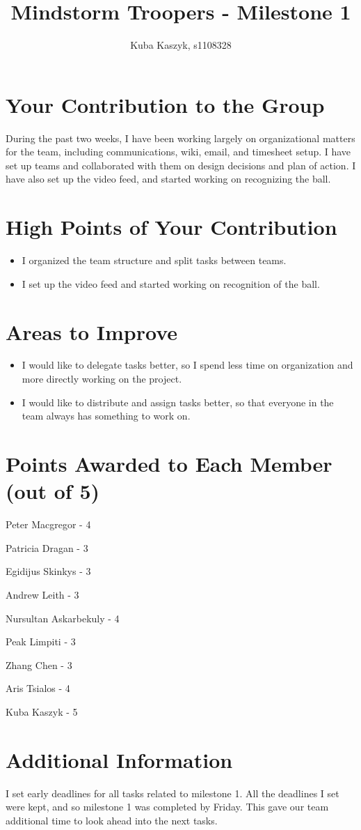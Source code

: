 \documentclass[dvips]{article}
\begin{document}
\sloppy
\title{Mindstorm Troopers - Milestone 1}
 
\author{Kuba Kaszyk, s1108328}
 
\maketitle

\section{Your Contribution to the Group}
During the past two weeks, I have been working largely on organizational matters for the team, including communications, wiki, email, and timesheet setup. I have set up teams and collaborated with them on design decisions and plan of action. I have also set up the video feed, and started working on recognizing the ball.  

\section{High Points of Your Contribution}
\begin{itemize}
  \item I organized the team structure and split tasks between teams.
  \item I set up the video feed and started working on recognition of the ball.
\end{itemize} 

\section{Areas to Improve}
\begin{itemize}
  \item I would like to delegate tasks better, so I spend less time on organization and more directly working on the project.
  \item I would like to distribute and assign tasks better, so that everyone in the team always has something to work on. 
\end{itemize}


\section{Points Awarded to Each Member (out of 5)}
\begin{itemize}
\begin{multicols}{2}
\item Peter Macgregor - 4
\item Patricia Dragan - 3
\item Egidijus Skinkys - 3
\item Andrew Leith - 3
\item Nursultan Askarbekuly - 4
\item Peak Limpiti - 3
\item Zhang Chen - 3
\item Aris Tsialos - 4
\item Kuba Kaszyk - 5
\end{multicols}
\end{itemize}

\section{Additional Information}
I set early deadlines for all tasks related to milestone 1. All the deadlines I set were kept, and so milestone 1 was completed by Friday. This gave our team additional time to look ahead into the next tasks.
\end{document}
